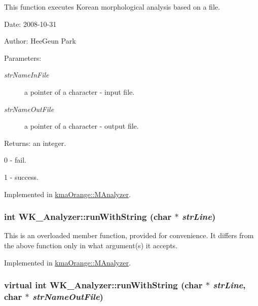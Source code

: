This function executes Korean morphological analysis based on a file. 

\begin{Desc}
\item[Date:]2008-10-31 \end{Desc}
\begin{Desc}
\item[Author:]HeeGeun Park \end{Desc}
\begin{Desc}
\item[Parameters:]
\begin{description}
\item[{\em strNameInFile}]a pointer of a character - input file. \item[{\em strNameOutFile}]a pointer of a character - output file. \end{description}
\end{Desc}
\begin{Desc}
\item[Returns:]an integer.\par
 0 - fail.\par
 1 - success. \end{Desc}


Implemented in \hyperlink{classkmaOrange_1_1MAnalyzer_246431a781ca9b42177f91a0856e89d2}{kmaOrange::MAnalyzer}.\hypertarget{classWK__Analyzer_8ac79b5e3342c0fa1adc587ba48472d6}{
\subsubsection[{runWithString}]{\setlength{\rightskip}{0pt plus 5cm}int WK\_\-Analyzer::runWithString (char $\ast$ {\em strLine})}}
\label{classWK__Analyzer_8ac79b5e3342c0fa1adc587ba48472d6}


This is an overloaded member function, provided for convenience. It differs from the above function only in what argument(s) it accepts. 

Implemented in \hyperlink{classkmaOrange_1_1MAnalyzer_ac3d886b94e80e65cfc220a79c2589e2}{kmaOrange::MAnalyzer}.\hypertarget{classWK__Analyzer_bb5e8ce81e579f6a33e12a03a3f35a51}{
\subsubsection[{runWithString}]{\setlength{\rightskip}{0pt plus 5cm}virtual int WK\_\-Analyzer::runWithString (char $\ast$ {\em strLine}, \/  char $\ast$ {\em strNameOutFile})}}
\label{classWK__Analyzer_bb5e8ce81e579f6a33e12a03a3f35a51}


